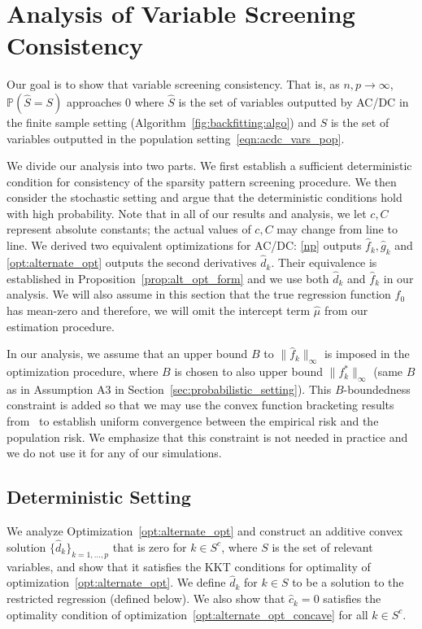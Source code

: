 \section{Analysis of Variable Screening Consistency}
\label{sec:finitesample}

Our goal is to show that variable screening consistency. That is, as $n,p \rightarrow \infty$, $\mathbb{P}( \hat{S} = S)$ approaches 0 where $\hat{S}$ is the set of variables outputted by AC/DC in the finite sample setting (Algorithm~\ref{fig:backfitting:algo}) and $S$ is the set of variables outputted in the population setting~\eqref{eqn:acdc_vars_pop}.

We divide our analysis into two parts. We first establish a sufficient
deterministic condition for consistency of the sparsity pattern
screening procedure.  We then consider the stochastic setting and argue that the 
deterministic conditions hold with high probability. Note that in all of our results 
and analysis, we let $c,
C$ represent absolute constants; the actual values of $c,C$ may change from line to line. We derived two equivalent optimizations for AC/DC: \eqref{np} outputs $\hat{f}_k, \hat{g}_k$ and \eqref{opt:alternate_opt} outputs the second derivatives $\hat{d}_k$. Their equivalence is established in Proposition~\ref{prop:alt_opt_form} and we use both $\hat{d}_k$ and $\hat{f}_k$ in our analysis. We will also assume in this section that the true regression function $f_0$ has mean-zero and therefore, we will omit the intercept term $\hat{\mu}$ from our estimation procedure.

In our analysis, we assume that an upper bound $B$ to $\| \hat{f}_k \|_\infty$ 
is imposed in the optimization procedure, where $B$ is chosen to also upper bound $\| f^*_k \|_\infty$ (same $B$ as in Assumption A3 in Section~\ref{sec:probabilistic_setting}). This $B$-boundedness constraint is added so that we may use the convex function bracketing results from~\cite{kim2014global} to establish uniform convergence between the empirical risk and the population risk. We emphasize that this constraint is not needed in practice and we do not use it for any of our simulations. 


\subsection{Deterministic Setting}

We analyze Optimization~\ref{opt:alternate_opt} and construct an additive convex solution $\{\hat{d}_k\}_{k=1,\ldots,p}$
that is zero for $k \in S^c$, where $S$ is the set of relevant
variables, and show that it satisfies the KKT
conditions for optimality of optimization~\eqref{opt:alternate_opt}. We
define $\hat{d}_k$ for $k \in S$ to be a solution to the restricted
regression (defined below). We also show that $\hat{c}_k =
0$ satisfies the optimality condition of
optimization~\eqref{opt:alternate_opt_concave} for all $k \in S^c$.

